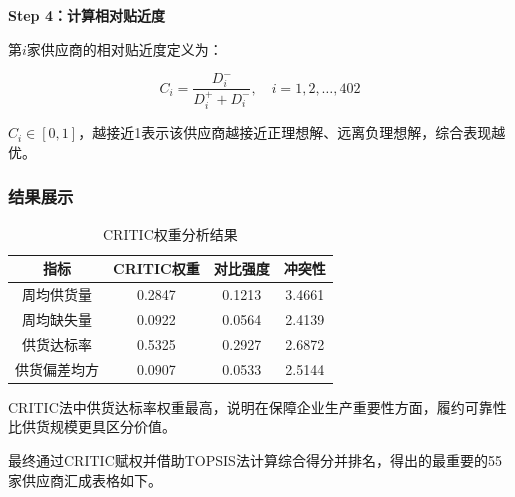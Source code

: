 \documentclass[12pt,a4paper]{ctexart}
\theoremstyle{definition}
\theoremstyle{plain}
\theoremstyle{remark}
\begin{document}
\textbf{Step 4：计算相对贴近度}

第$i$家供应商的相对贴近度定义为：

\begin{equation}
C_i = \frac{D_i^-}{D_i^+ + D_i^-}, \quad i = 1, 2, \dots, 402
\end{equation}

$C_i \in [0, 1]$，越接近1表示该供应商越接近正理想解、远离负理想解，综合表现越优。


\subsubsection{结果展示}

\begin{table}[H]
\centering
\caption{CRITIC权重分析结果}
\label{tab:critic}
\begin{tabular}{cccc}
\toprule
指标 & CRITIC权重 & 对比强度 & 冲突性 \\
\midrule
周均供货量 & 0.2847 & 0.1213 & 3.4661 \\
周均缺失量 & 0.0922 & 0.0564 & 2.4139 \\
供货达标率 & 0.5325 & 0.2927 & 2.6872 \\
供货偏差均方 & 0.0907 & 0.0533 & 2.5144 \\
\bottomrule
\end{tabular}
\end{table}
CRITIC法中供货达标率权重最高，说明在保障企业生产重要性方面，履约可靠性比供货规模更具区分价值。

最终通过CRITIC赋权并借助TOPSIS法计算综合得分并排名，得出的最重要的55家供应商汇成表格如下。
\end{document}
